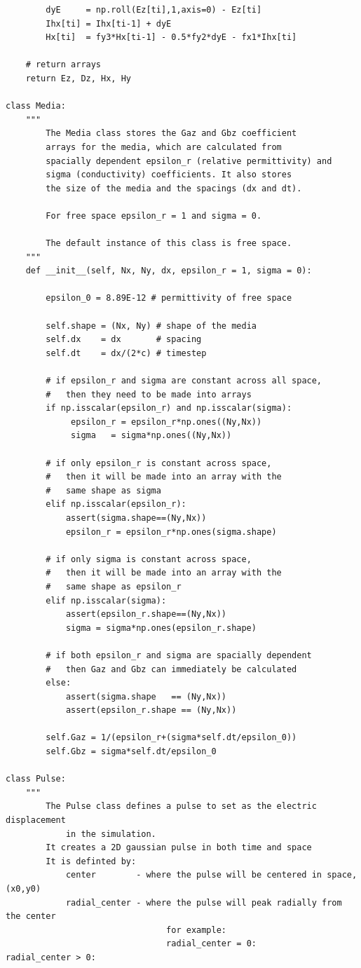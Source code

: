 \documentclass[12pt]{article}
\begin{document}
\begin{verbatim}
        dyE     = np.roll(Ez[ti],1,axis=0) - Ez[ti]
        Ihx[ti] = Ihx[ti-1] + dyE
        Hx[ti]  = fy3*Hx[ti-1] - 0.5*fy2*dyE - fx1*Ihx[ti]

    # return arrays
    return Ez, Dz, Hx, Hy

class Media:
    """
        The Media class stores the Gaz and Gbz coefficient
        arrays for the media, which are calculated from
        spacially dependent epsilon_r (relative permittivity) and
        sigma (conductivity) coefficients. It also stores
        the size of the media and the spacings (dx and dt).

        For free space epsilon_r = 1 and sigma = 0.

        The default instance of this class is free space.
    """
    def __init__(self, Nx, Ny, dx, epsilon_r = 1, sigma = 0):

        epsilon_0 = 8.89E-12 # permittivity of free space

        self.shape = (Nx, Ny) # shape of the media
        self.dx    = dx       # spacing
        self.dt    = dx/(2*c) # timestep

        # if epsilon_r and sigma are constant across all space,
        #   then they need to be made into arrays
        if np.isscalar(epsilon_r) and np.isscalar(sigma):
             epsilon_r = epsilon_r*np.ones((Ny,Nx))
             sigma   = sigma*np.ones((Ny,Nx))

        # if only epsilon_r is constant across space,
        #   then it will be made into an array with the
        #   same shape as sigma
        elif np.isscalar(epsilon_r):
            assert(sigma.shape==(Ny,Nx))
            epsilon_r = epsilon_r*np.ones(sigma.shape)

        # if only sigma is constant across space,
        #   then it will be made into an array with the
        #   same shape as epsilon_r
        elif np.isscalar(sigma):
            assert(epsilon_r.shape==(Ny,Nx))
            sigma = sigma*np.ones(epsilon_r.shape)

        # if both epsilon_r and sigma are spacially dependent
        #   then Gaz and Gbz can immediately be calculated
        else:
            assert(sigma.shape   == (Ny,Nx))
            assert(epsilon_r.shape == (Ny,Nx))

        self.Gaz = 1/(epsilon_r+(sigma*self.dt/epsilon_0))
        self.Gbz = sigma*self.dt/epsilon_0

class Pulse:
    """
        The Pulse class defines a pulse to set as the electric displacement
            in the simulation.
        It creates a 2D gaussian pulse in both time and space
        It is definted by:
            center        - where the pulse will be centered in space, (x0,y0)
            radial_center - where the pulse will peak radially from the center
                                for example:
                                radial_center = 0:          radial_center > 0:


\end{verbatim}
\end{document}
